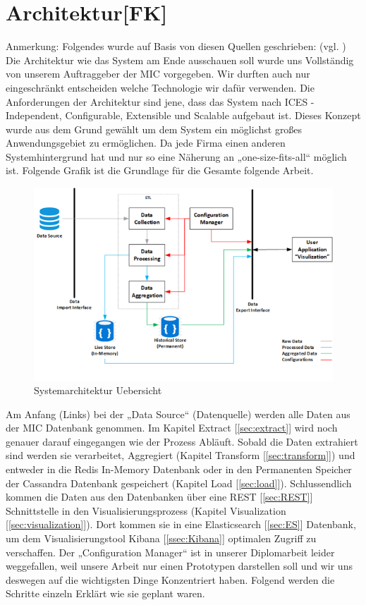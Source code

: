 \section{Architektur[FK]}
Anmerkung: Folgendes wurde auf Basis von diesen Quellen geschrieben: (vgl. \cite{bashar_architekturvorgabe_2019})
Die Architektur wie das System am Ende ausschauen soll wurde uns Vollständig von unserem Auftraggeber der MIC vorgegeben. Wir durften auch nur eingeschränkt entscheiden welche Technologie wir dafür verwenden. 
Die Anforderungen der Architektur sind jene, dass das System nach ICES - Independent, Configurable, Extensible und Scalable aufgebaut ist. Dieses Konzept wurde aus dem Grund gewählt um dem System ein möglichst großes Anwendungsgebiet zu ermöglichen. Da jede Firma einen anderen Systemhintergrund hat und nur so eine Näherung an „one-size-fits-all“ möglich ist. 
Folgende Grafik ist die Grundlage für die Gesamte folgende Arbeit.
\begin{figure}[H]
    \centering
    \includegraphics[scale=0.9]{images/architektur_uebersicht.png}
    \caption{Systemarchitektur Uebersicht}
    \label{img:architektur_uebersicht}
\end{figure}
Am Anfang (Links) bei der „Data Source“ (Datenquelle) werden alle Daten aus der MIC Datenbank genommen. Im Kapitel Extract [\ref{sec:extract}] wird noch genauer darauf eingegangen wie der Prozess Abläuft. 
Sobald die Daten extrahiert sind werden sie verarbeitet, Aggregiert (Kapitel Transform [\ref{sec:transform}])  und entweder in die Redis In-Memory Datenbank oder in den Permanenten Speicher der Cassandra Datenbank gespeichert (Kapitel Load [\ref{sec:load}]). 
Schlussendlich kommen die Daten aus den Datenbanken über eine REST [\ref{sec:REST}] Schnittstelle in den Visualisierungsprozess (Kapitel Visualization [\ref{sec:visualization}]). Dort kommen sie in eine Elasticsearch [\ref{sec:ES}] Datenbank, um dem Visualisierungstool Kibana [\ref{ssec:Kibana}] optimalen Zugriff zu verschaffen.
Der „Configuration Manager“ ist in unserer Diplomarbeit leider weggefallen, weil unsere Arbeit nur einen Prototypen darstellen soll und wir uns deswegen auf die wichtigsten Dinge Konzentriert haben.
Folgend werden die Schritte einzeln Erklärt wie sie geplant waren.
